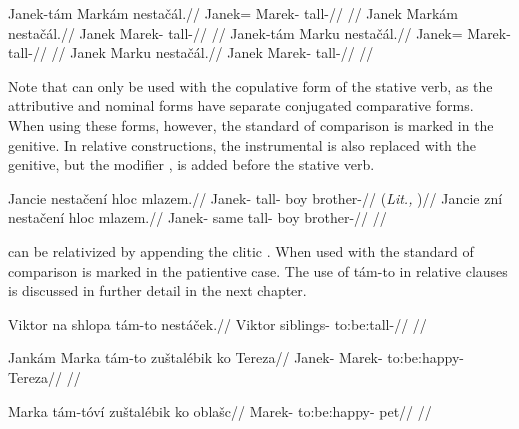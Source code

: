 \pex
\a
\begingl
\gla Janek-t\'am Mark\'am nesta\v{c}\'al.//
\glb Janek= Marek- tall-//
\glft {}//
\endgl
\a
\begingl
\gla Janek Mark\'am nesta\v{c}\'al.//
\glb Janek Marek- tall-//
\glft {}//
\endgl
\xe
\pex
\a
\begingl
\gla Janek-t\'am Marku nesta\v{c}\'al.//
\glb Janek= Marek- tall-//
\glft {}//
\endgl
\a
\begingl
\gla Janek Marku nesta\v{c}\'al.//
\glb Janek Marek- tall-//
\glft {}//
\endgl
\xe

Note that  can only be used with the copulative form of the stative verb, as the attributive and nominal forms have separate conjugated comparative forms. When using these forms, however, the standard of comparison is marked in the genitive. In relative constructions, the instrumental is also replaced with the genitive, but the modifier ,  is added before the stative verb.

\pex
\a
\begingl
\gla Jancie nesta\v{c}en\'i hloc mlazem.//
\glb Janek- tall- boy brother-//
\glft {} (\emph{Lit.,} )//
\endgl
\a
\begingl
\gla Jancie zn\'i nesta\v{c}en\'i hloc mlazem.//
\glb Janek- same tall- boy brother-//
\glft {}//
\endgl
\xe

 can be relativized by appending the clitic . When used with  the standard of comparison is marked in the patientive case. The use of t\'am-to in relative clauses is discussed in further detail in the next chapter.

\ex
\begingl
\gla Viktor na shlopa t\'am-to nest\'a\v{c}ek.//
\glb Viktor  siblings-  to:be:tall-//
\glft {}//
\endgl
\xe

\ex
\begingl
\gla Jank\'am Marka t\'am-to zu\v{s}tal\'ebik ko Tereza//
\glb Janek- Marek-  to:be:happy-  Tereza//
\glft {}//
\endgl
\xe

\ex
\begingl
\gla Marka t\'am-t\'ov\'i zu\v{s}tal\'ebik ko obla\v{s}c//
\glb Marek-  to:be:happy-  pet//
\glft {}//
\endgl
\xe

